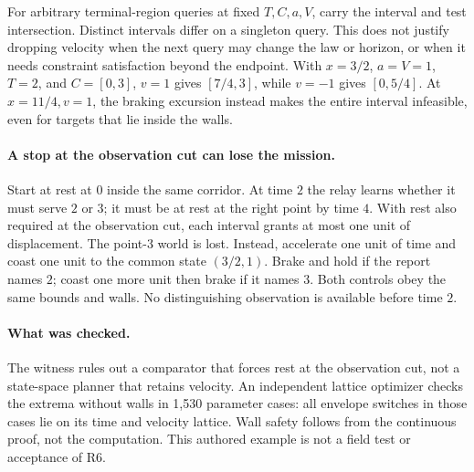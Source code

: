 \documentclass[11pt]{article}
\begin{document}
For arbitrary terminal-region queries at fixed \(T,C,a,V\), carry the
interval and test intersection. Distinct intervals differ on a singleton
query. This does not justify dropping velocity when the next query may
change the law or horizon, or when it needs constraint satisfaction
beyond the endpoint. With \(x=3/2\), \(a=V=1\), \(T=2\), and \(C=[0,3]\),
\(v=1\) gives \([7/4,3]\), while \(v=-1\) gives \([0,5/4]\).
At \(x=11/4,v=1\), the braking excursion instead makes the entire
interval infeasible, even for targets that lie inside the walls.

\paragraph{A stop at the observation cut can lose the mission.}
Start at rest at \(0\) inside the same corridor. At time \(2\) the
relay learns whether it must serve \(2\) or \(3\); it must be at
rest at the right point by time \(4\). With rest also required at the
observation cut, each interval grants at most one unit of displacement.
The point-\(3\) world is lost. Instead, accelerate one unit of time
and coast one unit to the common state \((3/2,1)\). Brake and hold if
the report names \(2\); coast one more unit then brake if it names
\(3\). Both controls obey the same bounds and walls. No distinguishing
observation is available before time \(2\).

\paragraph{What was checked.}
The witness rules out a comparator that forces rest at the observation
cut, not a state-space planner that retains velocity. An independent
lattice optimizer checks the extrema without walls in 1,530 parameter
cases: all envelope switches in those cases lie on its time and
velocity lattice. Wall safety follows from the continuous proof,
not the computation. This authored example is not a field test or
acceptance of R6.
\end{document}
